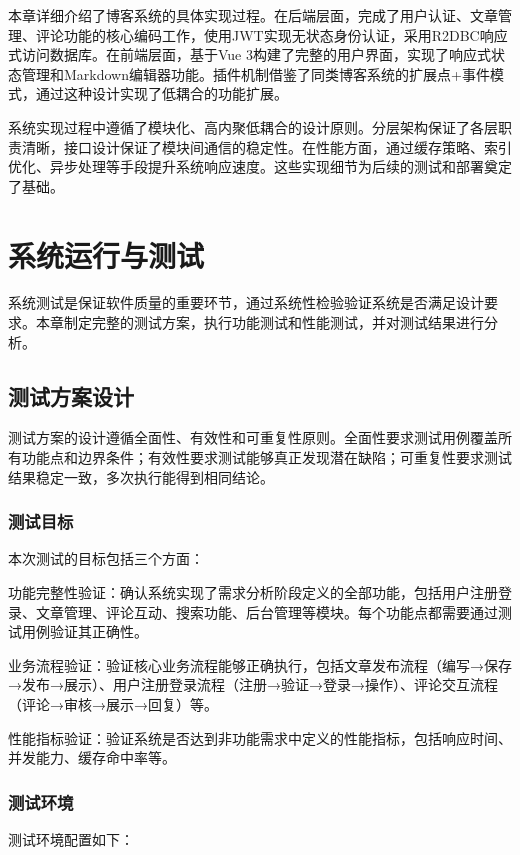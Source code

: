 \documentclass[UTF8,AutoFakeBold=1,AutoFakeSlant,zihao=-4]{SCAU}
\begin{document}
 本章详细介绍了博客系统的具体实现过程。在后端层面，完成了用户认证、文章管理、评论功能的核心编码工作，使用JWT实现无状态身份认证，采用R2DBC响应式访问数据库。在前端层面，基于Vue 3构建了完整的用户界面，实现了响应式状态管理和Markdown编辑器功能。插件机制借鉴了同类博客系统的扩展点+事件模式，通过这种设计实现了低耦合的功能扩展。

 系统实现过程中遵循了模块化、高内聚低耦合的设计原则。分层架构保证了各层职责清晰，接口设计保证了模块间通信的稳定性。在性能方面，通过缓存策略、索引优化、异步处理等手段提升系统响应速度。这些实现细节为后续的测试和部署奠定了基础。

 \section{系统运行与测试}

 系统测试是保证软件质量的重要环节，通过系统性检验验证系统是否满足设计要求。本章制定完整的测试方案，执行功能测试和性能测试，并对测试结果进行分析。

 \subsection{测试方案设计}

 测试方案的设计遵循全面性、有效性和可重复性原则。全面性要求测试用例覆盖所有功能点和边界条件；有效性要求测试能够真正发现潜在缺陷；可重复性要求测试结果稳定一致，多次执行能得到相同结论。

 \subsubsection{测试目标}

 本次测试的目标包括三个方面：

 功能完整性验证：确认系统实现了需求分析阶段定义的全部功能，包括用户注册登录、文章管理、评论互动、搜索功能、后台管理等模块。每个功能点都需要通过测试用例验证其正确性。

 业务流程验证：验证核心业务流程能够正确执行，包括文章发布流程（编写→保存→发布→展示）、用户注册登录流程（注册→验证→登录→操作）、评论交互流程（评论→审核→展示→回复）等。

 性能指标验证：验证系统是否达到非功能需求中定义的性能指标，包括响应时间、并发能力、缓存命中率等。

 \subsubsection{测试环境}

 测试环境配置如下：
\end{document}
